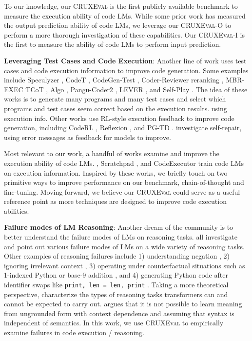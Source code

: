 \documentclass{article}
\newcommand{\benchmark}{\textsc{CRUXEval}\xspace}
\newcommand{\benchmarki}{\textsc{CRUXEval-I}\xspace}
\newcommand{\benchmarko}{\textsc{CRUXEval-O}\xspace}
\theoremstyle{plain}
\theoremstyle{definition}
\theoremstyle{remark}
\begin{document}
To our knowledge, our \benchmark is the first publicly available benchmark to measure the execution ability of code LMs. While some prior work has measured the output prediction ability of code LMs, we leverage our \benchmarko to perform a more thorough investigation of these capabilities. Our \benchmarki is the first to measure the ability of code LMs to perform input prediction.

\textbf{Leveraging Test Cases and Code Execution}: Another line of work uses test cases and code execution information to improve code generation. Some examples include Speculyzer \citep{key2022speak}, CodeT \citep{chen2022codet}, CodeGen-Test \citep{zhong2022codegen}, Coder-Reviewer reranking \citep{zhang2023coder}, MBR-EXEC \citep{shi2022natural}
TCoT \citep{tian2023test},
Algo \citep{zhang2023algo}, Pangu-Coder2 \citep{shen2023pangu}, LEVER \cite{ni2023lever}, and Self-Play \citep{haluptzok2022language}.
The idea of these works is to generate many programs and many test cases and select which programs and test cases seem correct based on the execution results. 
using execution info. Other works use RL-style execution feedback to improve code generation, including CodeRL \citep{le2022coderl}, Reflexion \citep{shinn2023reflexion}, and PG-TD \citep{zhang2023planning}. \citep{chen2023teaching, olausson2023demystifying, madaan2023self, peng2023check, zhang2023self} investigate self-repair, using error messages as feedback for models to improve.

Most relevant to our work, a handful of works examine and improve the execution ability of code LMs. \cite{austin2021program}, 
Scratchpad \citep{nye2021show}, and CodeExecutor \citep{liu2023code} train code LMs on execution information. Inspired by these works, we briefly touch on two primitive ways to improve performance on our benchmark, chain-of-thought and fine-tuning. Moving forward, we believe our \benchmark could serve as a useful reference point as more techniques are designed to improve code execution abilities.

\textbf{Failure modes of LM Reasoning}: Another dream of the community is to better understand the failure modes of LMs on reasoning tasks. \cite{bubeck2023sparks, liu2023evaluating, arkoudas2023gpt, zhang2022paradox, dziri2023faith, olausson2023linc, lee2023teaching, zhang2023can} all investigate and point out various failure modes of LMs on a wide variety of reasoning tasks. Other examples of reasoning failures include 1) understanding negation \citep{hosseini2021understanding}, 2) ignoring irrelevant context \citep{shi2023large}, 3) operating under counterfactual situations such as 1-indexed Python or base-9 addition \citep{wu2023reasoning}, and 4) generating Python code after identifier swaps like \texttt{print, len = len, print} \citep{miceli2023larger}. Taking a more theoretical perspective, \cite{dziri2023faith, zhou2023algorithms, merrill2023expresssive, giannou2023looped} characterize the types of reasoning tasks transformers can and cannot be expected to carry out.
\cite{merrill2021provable} argues that it is not possible to learn meaning from ungrounded form with context dependence and assuming that syntax is independent of semantics. 
In this work, we use \benchmark to empirically examine failures in code execution / reasoning. 
\end{document}

